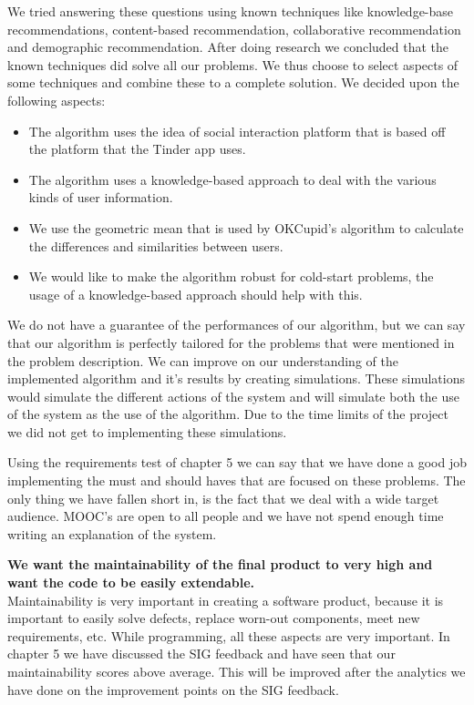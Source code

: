 We tried answering these questions using known techniques like knowledge-base recommendations, content-based recommendation, collaborative recommendation and demographic recommendation.
After doing research we concluded that the known techniques did solve all our problems.
We thus choose to select aspects of some techniques and combine these to a complete solution.
We decided upon the following aspects:
\begin{itemize}
\item The algorithm uses the idea of social interaction platform that is based off the platform that the Tinder app uses.
\item The algorithm uses a knowledge-based approach to deal with the various kinds of user information.
\item We use the geometric mean that is used by OKCupid's algorithm to calculate the differences and similarities between users.
\item We would like to make the algorithm robust for cold-start problems, the usage of a knowledge-based approach should help with this.
\end{itemize}

We do not have a guarantee of the performances of our algorithm, but we can say that our algorithm is perfectly tailored for the problems that were mentioned in the problem description.
We can improve on our understanding of the implemented algorithm and it's results by creating simulations.
These simulations would simulate the different actions of the system and will simulate both the use of the system as the use of the algorithm.
Due to the time limits of the project we did not get to implementing these simulations.

Using the requirements test of chapter 5 we can say that we have done a good job implementing the must and should haves that are focused on these problems.
The only thing we have fallen short in, is the fact that we deal with a wide target audience.
MOOC's are open to all people and we have not spend enough time writing an explanation of the system.

\textbf{We want the maintainability of the final product to very high and want the code to be easily extendable.}\\
Maintainability is very important in creating a software product, because it is important to easily solve defects, replace worn-out components, meet new requirements, etc.
While programming, all these aspects are very important.
In chapter 5 we have discussed the SIG feedback and have seen that our maintainability scores above average.
This will be improved after the analytics we have done on the improvement points on the SIG feedback.

